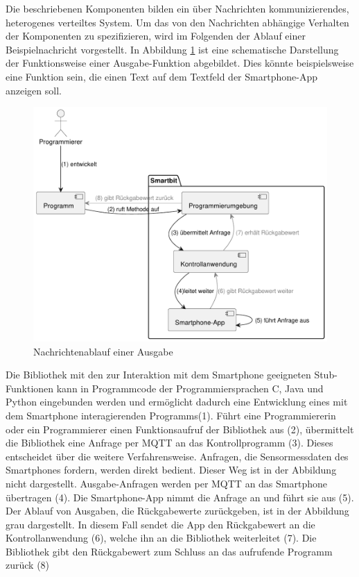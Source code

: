 \documentclass[11pt,a4paper]{report}
\begin{document}
Die beschriebenen Komponenten bilden ein über Nachrichten kommunizierendes, heterogenes verteiltes System.
Um das von den Nachrichten abhängige Verhalten der Komponenten zu spezifizieren, wird im Folgenden der Ablauf einer Beispielnachricht vorgestellt.
In Abbildung \ref{fig:arch_flow} ist eine schematische Darstellung der Funktionsweise einer Ausgabe-Funktion abgebildet.
Dies könnte beispielsweise eine Funktion sein, die einen Text auf dem Textfeld der Smartphone-App anzeigen soll.
\begin{figure}[htbp]
  \centering
  \includegraphics[width=\textwidth]{images/arch_call_flow.pdf}
  \caption{Nachrichtenablauf einer Ausgabe}
  \label{fig:arch_flow}
\end{figure}
Die Bibliothek mit den zur Interaktion mit dem Smartphone geeigneten Stub-Funktionen kann in Programmcode der Programmiersprachen C, Java und Python eingebunden werden und ermöglicht dadurch eine Entwicklung eines mit dem Smartphone interagierenden Programms(1).
Führt eine Programmiererin oder ein Programmierer einen Funktionsaufruf der Bibliothek aus (2), übermittelt die Bibliothek eine Anfrage per MQTT an das Kontrollprogramm (3).
Dieses entscheidet über die weitere Verfahrensweise.
Anfragen, die Sensormessdaten des Smartphones fordern, werden direkt bedient.
Dieser Weg ist in der Abbildung nicht dargestellt.
Ausgabe-Anfragen werden per MQTT an das Smartphone übertragen (4).
Die Smartphone-App nimmt die Anfrage an und führt sie aus (5).
Der Ablauf von Ausgaben, die Rückgabewerte zurückgeben, ist in der Abbildung grau dargestellt.
In diesem Fall sendet die App den Rückgabewert an die Kontrollanwendung (6), welche ihn an die Bibliothek weiterleitet (7).
Die Bibliothek gibt den Rückgabewert zum Schluss an das aufrufende Programm zurück (8)
\end{document}
